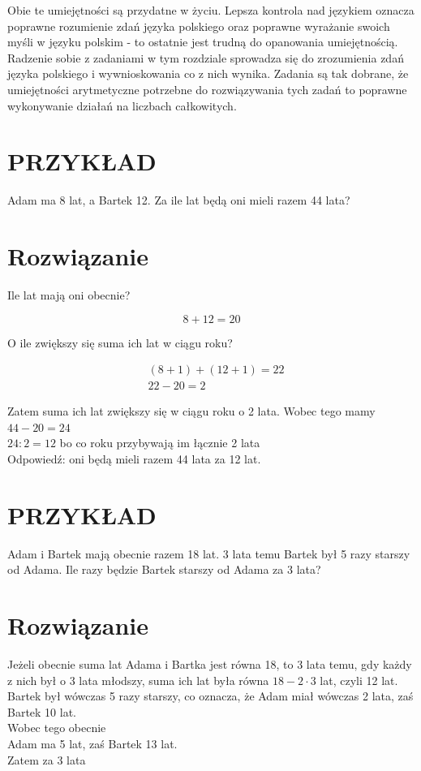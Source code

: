 \documentclass[10pt]{article}
\begin{document}
Obie te umiejętności są przydatne w życiu. Lepsza kontrola nad językiem oznacza poprawne rozumienie zdań języka polskiego oraz poprawne wyrażanie swoich myśli w języku polskim - to ostatnie jest trudną do opanowania umiejętnością.\\
Radzenie sobie z zadaniami w tym rozdziale sprowadza się do zrozumienia zdań języka polskiego i wywnioskowania co z nich wynika. Zadania są tak dobrane, że umiejętności arytmetyczne potrzebne do rozwiązywania tych zadań to poprawne wykonywanie działań na liczbach całkowitych.

\section*{PRZYKŁAD}
Adam ma 8 lat, a Bartek 12. Za ile lat będą oni mieli razem 44 lata?

\section*{Rozwiązanie}
Ile lat mają oni obecnie?

\[
8+12=20
\]

O ile zwiększy się suma ich lat w ciągu roku?

\[
\begin{aligned}
& (8+1)+(12+1)=22 \\
& 22-20=2
\end{aligned}
\]

Zatem suma ich lat zwiększy się w ciągu roku o 2 lata. Wobec tego mamy\\
\(44-20=24\)\\
\(24: 2=12\) bo co roku przybywają im łącznie 2 lata\\
Odpowiedź: oni będą mieli razem 44 lata za 12 lat.

\section*{PRZYKŁAD}
Adam i Bartek mają obecnie razem 18 lat. 3 lata temu Bartek był 5 razy starszy od Adama. Ile razy będzie Bartek starszy od Adama za 3 lata?

\section*{Rozwiązanie}
Jeżeli obecnie suma lat Adama i Bartka jest równa 18, to 3 lata temu, gdy każdy z nich był o 3 lata młodszy, suma ich lat była równa \(18-2 \cdot 3\) lat, czyli 12 lat. Bartek był wówczas 5 razy starszy, co oznacza, że Adam miał wówczas 2 lata, zaś Bartek 10 lat.\\
Wobec tego obecnie\\
Adam ma 5 lat, zaś Bartek 13 lat.\\
Zatem za 3 lata
\end{document}
